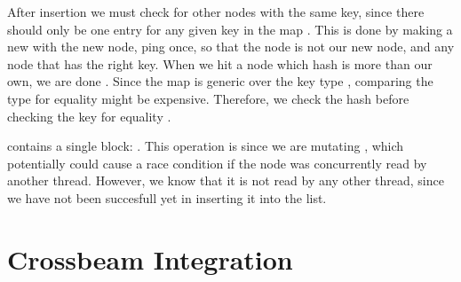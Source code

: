 After insertion we must check for other nodes with the same key, since there should only be one
entry for any given key in the map . This is done by making a new  with
the new node, ping once, so that the  node is not our new node, and
 any node that has the right key.  When we hit a node which hash is more than our
own, we are done .  Since the map is generic over the key type , comparing
the type for equality might be expensive. Therefore, we check the hash before checking the key for
equality .

 contains a single  block: . This operation is
 since we are mutating , which potentially could cause a race condition
if the node was concurrently read by another thread. However, we know that it is not read by any
other thread, since we have not been succesfull yet in inserting it into the list.




\section{Crossbeam Integration}
\lorem{}
